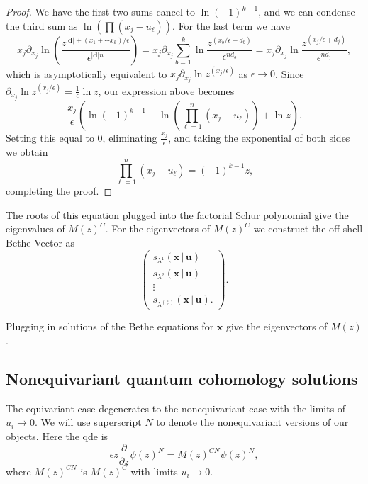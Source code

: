 \documentclass[12pt]{article}
\theoremstyle{plain}
\theoremstyle{definition}
\newcommand{\xb}{\boldsymbol{x}}
\newcommand{\db}{\boldsymbol{d}}
\newcommand{\ub}{\boldsymbol{u}}
\begin{document}
\begin{proof}
We have the first two sums cancel to $\ln (-1)^{k-1}$, and we can condense the third sum as $\ln (\prod (x_j-u_\ell))$. For the last term we have 
$$ x_j \partial_{x_j} \ln \left(\frac{ z^{|\db|+(x_1+\cdots x_k)/\epsilon} }{\epsilon^{|\db| n}}\right)=  x_j \partial_{x_j} \sum_{b=1}^k \ln \frac{z^{(x_b/\epsilon+d_b)}}{\epsilon^{nd_b}}= x_j \partial_{x_j} \ln \frac{z^{(x_j/\epsilon+d_j)}}{\epsilon^{nd_j}},$$
which is asymptotically equivalent to $x_j\partial_{x_j} \ln {z^{(x_j/\epsilon)}}$ as $\epsilon \to 0$. Since $\partial_{x_j} \ln {z^{(x_j/\epsilon)}}=\frac{1}{\epsilon}\ln z$, our expression above becomes
\begin{equation}
    \frac{x_j}{\epsilon}\left(\ln (-1)^{k-1} - \ln \left(\prod_{\ell=1} ^n (x_j-u_\ell)\right)+\ln z\right).
\end{equation}
Setting this equal to 0, eliminating $\frac{x_j}{\epsilon}$, and taking the exponential of both sides we obtain 
$$\prod_{\ell=1} ^n (x_j-u_\ell) = (-1)^{k-1} z,$$
completing the proof.
\end{proof}

The roots of this equation plugged into the factorial Schur polynomial give the eigenvalues of $M(z)^{C}$. For the eigenvectors of $M(z)^{C}$ we construct the off shell Bethe Vector as 
$$\begin{pmatrix}
    s_{\lambda^1} (\xb \, | \, \ub) \\
    s_{\lambda^2} (\xb \, | \, \ub)\\
    \vdots\\
    s_{\lambda^{\binom{n}{k}}}(\xb \, | \, \ub).
\end{pmatrix}.$$

Plugging in solutions of the Bethe equations for $\xb$ give the eigenvectors of $M(z)$.



\subsection{Nonequivariant quantum cohomology solutions}

The equivariant case degenerates to the nonequivariant case with the limits of $u_i \to 0$. We will use superscript $N$ to denote the nonequivariant versions of our objects. Here the qde is
\begin{equation} \label{psiCNEQ1n}
    \epsilon z \frac{\partial }{\partial z} \psi(z)^{N} = M(z)^{CN} \psi(z)^{N},
\end{equation}
where $M(z)^{CN}$ is $M(z)^{C}$ with limits $u_i\to 0$.
\end{document}
